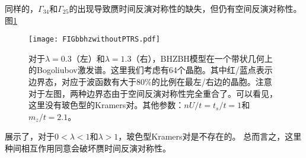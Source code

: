 同样的，$\Gamma_{34}$和$\Gamma_{25}$的出现导致赝时间反演对称性的缺失，但仍有空间反演对称性。
图\ref{BHZBHwithoutPTRS}%
\begin{figure}
	\texttt{[image: FIGbbhzwithoutPTRS.pdf]}
	\caption{对于$\lambda=0.3$（左）和$\lambda=1.3$（右），BHZBH模型在一个带状几何上的Bogoliubov激发谱。这里我们考虑有$64$个晶胞。其中红/蓝点表示边界态，对应于波函数有大于$80\%$的比例在最左/右边的晶胞。注意对于左图，两种边界态由于空间反演对称性完全重合了。可以看见，这里没有玻色型的Kramers对。其他参数：$nU/t=t_s/t=1$和$m_z/t=2.1$。}
	\label{BHZBHwithoutPTRS}
\end{figure}
展示了，对于$0<\lambda<1$和$\lambda>1$，玻色型Kramers对是不存在的。
总而言之，这里种间相互作用同意会破坏赝时间反演对称性。








